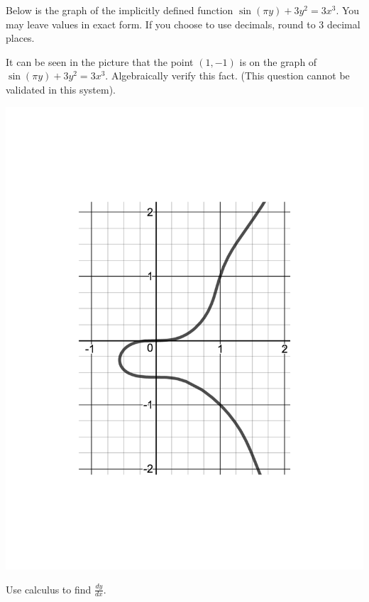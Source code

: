 \documentclass[handout]{ximera}
\begin{document}
\begin{problem}
Below is the graph of the implicitly defined function $\displaystyle\sin \left(\pi y\right)+3y^2=3x^3$. You may leave values in exact form. If you choose to use decimals, round to 3 decimal places.


	\begin{question}
	It can be seen in the picture that the point $(1,-1)$ is on the graph of $\displaystyle\sin \left(\pi y\right)+3y^2=3x^3$. Algebraically verify this fact. (This question cannot be validated in this system).\\
    \begin{freeResponse}
    \end{freeResponse}

    \includegraphics[scale=0.5]{Exam2-ImpDiff2.pdf}
    \end{question}
    
	
	\begin{question}
    Use calculus to find $\displaystyle\frac{dy}{dx}$.\\
    

\end{question}
\end{problem}
\end{document}
